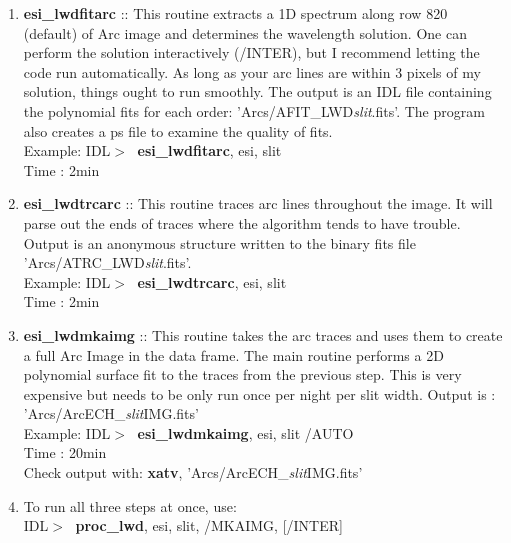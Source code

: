 \documentclass[11pt,letterpaper,dvips]{article}
\begin{document}
\begin{enumerate}
\begin{enumerate}
	\item {\bf esi\_lwdfitarc} :: This routine extracts a 1D spectrum along
	row 820 (default) of Arc image and determines the wavelength solution.  
	One can perform
	the solution interactively (/INTER), but I recommend letting the code
	run automatically.  As long as your arc lines are within 3 pixels of my 
	solution, things ought to run smoothly.
	The output is an IDL file containing the polynomial fits for each
	order: 'Arcs/AFIT\_LWD{\it slit}.fits'.  The program also creates
	a ps file to examine the quality of fits.\\
         \quad Example: IDL$> \;$ {\bf esi\_lwdfitarc}, esi, slit \\
         \quad Time   : 2min 

	\item {\bf esi\_lwdtrcarc} :: This routine traces arc lines throughout
	the image.  It will parse out the ends of traces where the algorithm
	tends to have trouble.
	Output is an anonymous structure written to the binary fits 
        file 'Arcs/ATRC\_LWD{\it slit}.fits'. \\
         \quad Example: IDL$> \;$ {\bf esi\_lwdtrcarc}, esi, slit \\
         \quad Time   : 2min  

	\item {\bf esi\_lwdmkaimg} :: This routine takes the arc traces and
	uses them to create a full Arc Image in the data frame.  The main
	routine performs a 2D polynomial surface fit to the traces from
	the previous step.  This is very expensive but needs to be only
	run once per night per slit width.
	Output is : 'Arcs/ArcECH\_{\it slit}IMG.fits'\\  
         \quad Example: IDL$> \;$ {\bf esi\_lwdmkaimg}, esi, slit /AUTO \\
         \quad Time   : 20min  \\
         \quad Check output with: {\bf xatv}, 'Arcs/ArcECH\_{\it slit}IMG.fits'
	\item To run all three steps at once, use:\\
         \quad IDL$> \;$ {\bf proc\_lwd}, esi, slit, /MKAIMG, [/INTER] \\
  \end{enumerate}


\end{enumerate}
\end{document}
